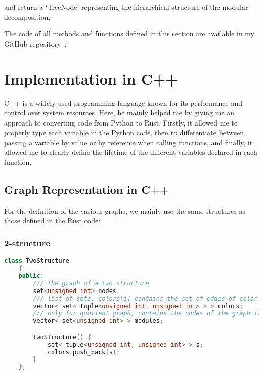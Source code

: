 and return a `TreeNode' representing the hierarchical structure of the modular decomposition.

\hspace{4cm}


The code of all methods and functions defined in this section are available in my GitHub repository~\cite{rustcode};


\section{Implementation in C++}\label{sec:implementation-in-c++}

C++ is a widely-used programming language known for its performance and control over system resources.
Here, he mainly helped me by giving me an approach to converting code from Python to Rust.
Firstly, it allowed me to properly type each variable in the Python code, then to differentiate between passing a variable by value or by reference when calling functions, and finally, it allowed me to clearly define the lifetime of the different variables declared in each function.

\subsection{Graph Representation in C++}\label{subsec:graph-representation-in-c++}

For the definition of the various graphs, we mainly use the same structures as those defined in the Rust code:

\subsubsection{2-structure}

\begin{lstlisting}[language=C++, style=cpp, caption={Defining the 2-Structure}, label={lst:cpp-define-2-structure}, firstnumber=1]
    class TwoStructure
    {
    public:
        /// the graph of a two structure
        set<unsigned int> nodes;
        /// list of sets, colors[i] contains the set of edges of color i
        vector< set< tuple<unsigned int, unsigned int> > > colors;
        /// only for quotient graph, contains the nodes of the graph if they are modules they
        vector< set<unsigned int> > modules;

        TwoStructure() {
            set< tuple<unsigned int, unsigned int> > s;
            colors.push_back(s);
        }
    };
\end{lstlisting}

